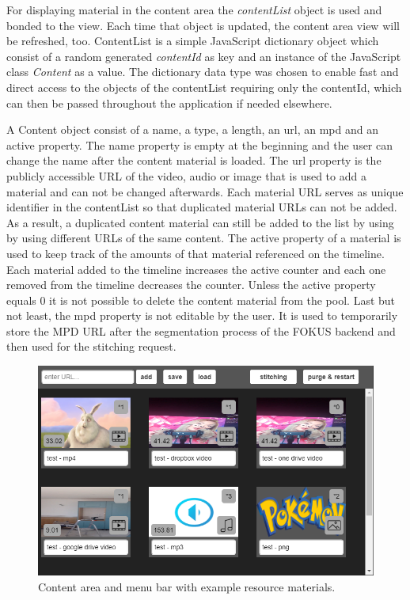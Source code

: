 \documentclass[conference]{IEEEtran}
\begin{document}
For displaying material in the content area the \textit{contentList} object is used and bonded to the view.
Each time that object is updated, the content area view will be refreshed, too.
ContentList is a simple JavaScript dictionary object which consist of a random generated \textit{contentId} as key and an instance of the JavaScript class \textit{Content} as a value.
The dictionary data type was chosen to enable fast and direct access to the objects of the contentList requiring only the contentId, which can then be passed throughout the application if needed elsewhere.

A Content object consist of a name, a type, a length, an url, an mpd and an active property.
The name property is empty at the beginning and the user can change the name after the content material is loaded.
The url property is the publicly accessible URL of the video, audio or image that is used to add a material and can not be changed afterwards.
Each material URL serves as unique identifier in the contentList so that duplicated material URLs can not be added.
As a result, a duplicated content material can still be added to the list by using by using different URLs of the same content.
The active property of a material is used to keep track of the amounts of that material referenced on the timeline.
Each material added to the timeline increases the active counter and each one removed from the timeline decreases the counter.
Unless the active property equals 0 it is not possible to delete the content material from the pool.
Last but not least, the mpd property is not editable by the user. It is used to temporarily store the MPD URL after the segmentation process of the FOKUS backend and then used for the stitching request.
\begin{figure}[H]
\centering
\includegraphics[scale=0.46]{content_area.png}
\caption{Content area and menu bar with example resource materials.}
\end{figure}
\end{document}
